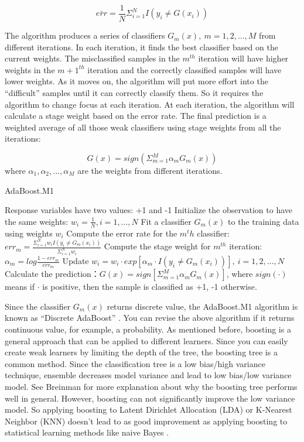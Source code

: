 \documentclass[12pt,]{krantz}
\begin{document}
\[\bar{err}=\frac{1}{N}\Sigma_{i=1}^NI(y_i\neq G(x_i))\]

The algorithm produces a series of classifiers \(G_m(x),\ m=1,2,...,M\) from different iterations. In each iteration, it finds the best classifier based on the current weights. The misclassified samples in the \(m^{th}\) iteration will have higher weights in the \(m+1^{th}\) iteration and the correctly classified samples will have lower weights. As it moves on, the algorithm will put more effort into the ``difficult'' samples until it can correctly classify them. So it requires the algorithm to change focus at each iteration. At each iteration, the algorithm will calculate a stage weight based on the error rate. The final prediction is a weighted average of all those weak classifiers using stage weights from all the iterations:

\[G(x)=sign ( \Sigma_{m=1}^M \alpha_{m}G_m(x))\]
where \(\alpha_1,\alpha_2,...,\alpha_M\) are the weights from different iterations.

\begin{algorithm}
\caption{AdaBoost.M1}\label{AdaBoostM1algorithm} 
\begin{algorithmic}[1] 
\State Response variables have two values: +1 and -1
\State Initialize the observation to have the same weights:  $w_i=\frac{1}{N},i=1,...,N$
    \State Fit a classifier $G_m(x)$ to the training data using weights $w_i$
    \State Compute the error rate for the $m^th$ classifier: $err_m=\frac{\Sigma_{i=1}^Nw_i I(y_i\neq G_m(x_i))}{\Sigma_{i=1}^Nw_i}$
    \State Compute the stage weight for $m^{th}$ iteration: $\alpha_m=log\frac{1-err_m}{err_m}$
    \State Update $w_i = w_i\cdot exp[\alpha_m\cdot I(y_i \neq G_m(x_i))],\ i=1,2,\dots,N$
\EndFor
\State Calculate the prediction：$G(x)=sign[\Sigma_{m=1}^M\alpha_mG_m(x)]$, where $sign(\cdot)$ means if $\cdot$ is positive, then the sample is classified as +1, -1 otherwise.
\end{algorithmic}
\end{algorithm}

Since the classifier \(G_m(x)\) returns discrete value, the AdaBoost.M1 algorithm is known as ``Discrete AdaBoost'' \citep{Friedman2000}. You can revise the above algorithm if it returns continuous value, for example, a probability\citep{Friedman2000}. As mentioned before, boosting is a general approach that can be applied to different learners. Since you can easily create weak learners by limiting the depth of the tree, the boosting tree is a common method. Since the classification tree is a low bias/high variance technique, ensemble decreases model variance and lead to low bias/low variance model. See Breinman\citep{Breiman1998} for more explanation about why the boosting tree performs well in general. However, boosting can not significantly improve the low variance model. So applying boosting to Latent Dirichlet Allocation (LDA) or K-Nearest Neighbor (KNN) doesn't lead to as good improvement as applying boosting to statistical learning methods like naive Bayes \citep{Bauer1999}.
\end{document}
